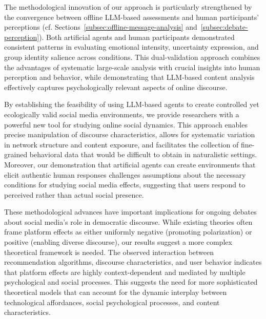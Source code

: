 The methodological innovation of our approach is particularly strengthened by the convergence between offline LLM-based assessments and human participants' perceptions (cf. Sections~\ref{subsec:offline-message-analysis} and~\ref{subsec:debate-perception}). Both artificial agents and human participants demonstrated consistent patterns in evaluating emotional intensity, uncertainty expression, and group identity salience across conditions. This dual-validation approach combines the advantages of systematic large-scale analysis with crucial insights into human perception and behavior, while demonstrating that LLM-based content analysis effectively captures psychologically relevant aspects of online discourse.

By establishing the feasibility of using LLM-based agents to create controlled yet ecologically valid social media environments, we provide researchers with a powerful new tool for studying online social dynamics. This approach enables precise manipulation of discourse characteristics, allows for systematic variation in network structure and content exposure, and facilitates the collection of fine-grained behavioral data that would be difficult to obtain in naturalistic settings. Moreover, our demonstration that artificial agents can create environments that elicit authentic human responses challenges assumptions about the necessary conditions for studying social media effects, suggesting that users respond to perceived rather than actual social presence.

These methodological advances have important implications for ongoing debates about social media's role in democratic discourse. While existing theories often frame platform effects as either uniformly negative (promoting polarization) or positive (enabling diverse discourse), our results suggest a more complex theoretical framework is needed. The observed interaction between recommendation algorithms, discourse characteristics, and user behavior indicates that platform effects are highly context-dependent and mediated by multiple psychological and social processes. This suggests the need for more sophisticated theoretical models that can account for the dynamic interplay between technological affordances, social psychological processes, and content characteristics.


